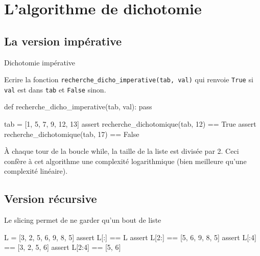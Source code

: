\def\chaptercode{AL03}    %
\def\chaptername{Diviser pour régner}        %

\titre{}

\medskip

\section{L'algorithme de dichotomie}

\subsection{La version impérative}

\begin{exercice}{Dichotomie impérative}{}
\medskip

Ecrire la fonction \verb+recherche_dicho_imperative(tab, val)+ qui renvoie \verb+True+ si \verb+val+ est dans \verb+tab+ et \verb+False+ sinon.

\begin{minipage}{0.49\linewidth}
    \begin{CodePythontexAlt}[Largeur=1\linewidth,Centre,Lignes=true,PremLigne=1]{}
        def recherche_dicho_imperative(tab, val):
            pass
        
        tab = [1, 5, 7, 9, 12, 13]
        assert recherche_dichotomique(tab, 12) == True
        assert recherche_dichotomique(tab, 17) == False
                \end{CodePythontexAlt}
\end{minipage}\hfill
\begin{minipage}{0.49\linewidth}
    À chaque tour de la boucle while, la taille de la liste est divisée par 2. Ceci confère à cet algorithme une complexité logarithmique (bien meilleure qu'une complexité linéaire).

\end{minipage}


\end{exercice}



\subsection{Version récursive}

\begin{remarque}{Le slicing permet de ne garder qu'un bout de liste}{}

\begin{CodePythontexAlt}[Largeur=1\linewidth,Centre,Lignes=true,PremLigne=1]{}
L = [3, 2, 5, 6, 9, 8, 5]
assert L[:] == L
assert L[2:] == [5, 6, 9, 8, 5]
assert L[:4] == [3, 2, 5, 6]
assert L[2:4] == [5, 6]
            \end{CodePythontexAlt}

\end{remarque}

